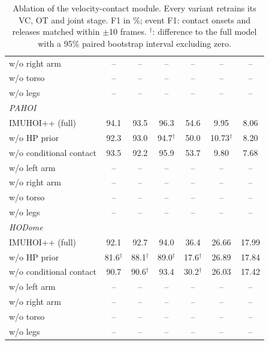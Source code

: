 \begin{table}[t]
\begin{tabular}{lcccccc}
w/o right arm & -- & -- & -- & -- & -- & -- \\
w/o torso & -- & -- & -- & -- & -- & -- \\
w/o legs & -- & -- & -- & -- & -- & -- \\
\midrule
\multicolumn{7}{l}{\textit{PAHOI}} \\
IMUHOI++ (full) & 94.1 & 93.5 & 96.3 & 54.6 & 9.95 & 8.06 \\
w/o HP prior & 92.3 & 93.0 & 94.7$^\dagger$ & 50.0 & 10.73$^\dagger$ & 8.20 \\
w/o conditional contact & 93.5 & 92.2 & 95.9 & 53.7 & 9.80 & 7.68 \\
w/o left arm & -- & -- & -- & -- & -- & -- \\
w/o right arm & -- & -- & -- & -- & -- & -- \\
w/o torso & -- & -- & -- & -- & -- & -- \\
w/o legs & -- & -- & -- & -- & -- & -- \\
\midrule
\multicolumn{7}{l}{\textit{HODome}} \\
IMUHOI++ (full) & 92.1 & 92.7 & 94.0 & 36.4 & 26.66 & 17.99 \\
w/o HP prior & 81.6$^\dagger$ & 88.1$^\dagger$ & 89.0$^\dagger$ & 17.6$^\dagger$ & 26.89 & 17.84 \\
w/o conditional contact & 90.7 & 90.6$^\dagger$ & 93.4 & 30.2$^\dagger$ & 26.03 & 17.42 \\
w/o left arm & -- & -- & -- & -- & -- & -- \\
w/o right arm & -- & -- & -- & -- & -- & -- \\
w/o torso & -- & -- & -- & -- & -- & -- \\
w/o legs & -- & -- & -- & -- & -- & -- \\
\bottomrule
\end{tabular}
\caption{Ablation of the velocity-contact module. Every variant retrains its VC, OT and joint stage. F1 in \%; event F1: contact onsets and releases matched within $\pm$10 frames. $^\dagger$: difference to the full model with a 95\% paired bootstrap interval excluding zero.}
\label{tab:vc_ablation}
\end{table}

